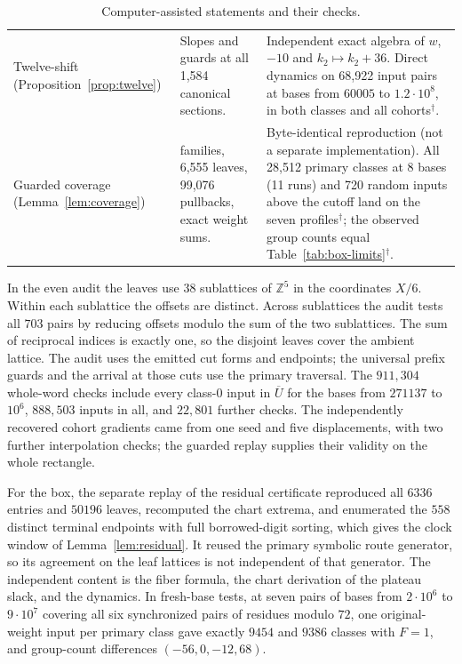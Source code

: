 \documentclass[11pt,reqno]{amsart}
\theoremstyle{remark}
\newcommand{\Z}{\mathbb Z}
\begin{document}
\begin{table}[htbp]
\begin{tabular}{@{}>{\raggedright\arraybackslash}p{.2\linewidth}>{\raggedright\arraybackslash}p{.31\linewidth}>{\raggedright\arraybackslash}p{.43\linewidth}@{}}
Twelve-shift (Proposition~\ref{prop:twelve}) &
Slopes and guards at all 1,584 canonical sections. &
Independent exact algebra of \(w\), \(-10\) and \(k_2\mapsto k_2+36\). Direct dynamics on 68,922 input pairs at bases from \(60005\) to \(1.2\cdot10^8\), in both classes and all cohorts\(^\dagger\).\\
Guarded coverage (Lemma~\ref{lem:coverage}) &
99 families, 6,555 leaves, 99,076 pullbacks, exact weight sums. &
Byte-identical reproduction (not a separate implementation). All 28,512 primary classes at 8 bases (11 runs) and 720 random inputs above the cutoff land on the seven profiles\(^\dagger\); the observed group counts equal Table~\ref{tab:box-limits}\(^\dagger\).\\
\hline
\end{tabular}
\caption{Computer-assisted statements and their checks.}\label{tab:verification}
\end{table}

In the even audit the leaves use \(38\) sublattices of \(\Z^5\) in the coordinates \(X/6\). Within each sublattice the offsets are distinct. Across sublattices the audit tests all \(703\) pairs by reducing offsets modulo the sum of the two sublattices. The sum of reciprocal indices is exactly one, so the disjoint leaves cover the ambient lattice. The audit uses the emitted cut forms and endpoints; the universal prefix guards and the arrival at those cuts use the primary traversal. The \(911{,}304\) whole-word checks include every class-\(0\) input in \(\overline U\) for the bases from \(271137\) to \(10^6\), \(888{,}503\) inputs in all, and \(22{,}801\) further checks. The independently recovered cohort gradients came from one seed and five displacements, with two further interpolation checks; the guarded replay supplies their validity on the whole rectangle.

For the box, the separate replay of the residual certificate reproduced all \(6336\) entries and \(50196\) leaves, recomputed the chart extrema, and enumerated the \(558\) distinct terminal endpoints with full borrowed-digit sorting, which gives the clock window of Lemma~\ref{lem:residual}. It reused the primary symbolic route generator, so its agreement on the leaf lattices is not independent of that generator. The independent content is the fiber formula, the chart derivation of the plateau slack, and the dynamics. In fresh-base tests, at seven pairs of bases from \(2\cdot10^6\) to \(9\cdot10^7\) covering all six synchronized pairs of residues modulo \(72\), one original-weight input per primary class gave exactly \(9454\) and \(9386\) classes with \(F=1\), and group-count differences \((-56,0,-12,68)\).
\end{document}
